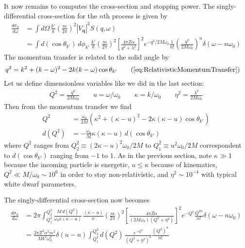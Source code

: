 \documentclass{article}
\begin{document}
It now remains to computes the cross-section and stopping power. The singly-differential cross-section for the $n$th process is given by
\begin{align}
\frac{d \sigma_n}{d \omega} &= \int d \Omega\, \frac{k'}{k} \left( \frac{m}{2 \pi} \right)^2 |V_\textbf{q}|^2 S(q, \omega)  \\
&= \int d(\cos\theta_{k'})\, d \phi_{k'}\, \frac{k'}{k} \left( \frac{m}{2 \pi} \right)^2 \left[ \frac{4 \pi Z\alpha}{q^2 + \lambda^2} \right]^2 e^{-q^2 / 2 M \omega_0} \frac{1}{n!}\left( \frac{q^2}{2 M \omega_0} \right)^n \delta(\omega - n \omega_0) \nonumber
\end{align}
The momentum transfer is related to the solid angle by
\begin{align}
q^2 &= k^2 + (k - \omega)^2 - 2 k(k - \omega)\cos\theta_{k'} \tag{\ref{eq:RelativisticMomentumTransfer}}
\end{align}
Let us define dimensionless variables like we did in the last section:
\begin{align}
Q^2 = \frac{q^2}{2 M \omega_0} \qquad u = \omega / \omega_0 \qquad \kappa = k / \omega_0 \qquad \eta^2 = \frac{\lambda^2}{2 M \omega_0}
\end{align}
Then from the momentum transfer we find
\begin{align}
Q^2 &= \frac{\omega_0}{2 M}\left( \kappa^2 + (\kappa - u)^2 - 2 \kappa(\kappa - u)\cos\theta_{k'} \right) \\
d(Q^2) &= -\frac{\omega_0}{M} \kappa(\kappa - u)\, d(\cos\theta_{k'})
\end{align}
where $Q^2$ ranges from $Q_2^2 \equiv (2 \kappa - u)^2 \omega_0 / 2 M$ to $Q_1^2 \equiv u^2 \omega_0 / 2 M$ correspondent to $d(\cos\theta_{k'})$ ranging from $-1$ to $1$. As in the previous section, note $\kappa \gg 1$ because the incoming particle is energetic, $u\leq \kappa$ because of kinematics, $Q^2 \ll M / \omega_0 \sim 10^6$ in order to stay non-relativistic, and $\eta^2 \sim 10^{-4}$ with typical white dwarf parameters.

The singly-differential cross-section now becomes
\begin{align}
\frac{d \sigma_n}{d \omega} &= 2 \pi\int_{Q_1^2}^{Q_2^2} \frac{M\,d(Q^2)}{\omega_0 \kappa(\kappa - u)}\, \frac{(\kappa - u)}{\kappa} \left( \frac{m}{2 \pi} \right)^2 \left[ \frac{4 \pi Z\alpha}{(2 M \omega_0)(Q^2 + \eta^2)} \right]^2 e^{-Q^2} \frac{Q^{2 n}}{n!} \delta(\omega - n \omega_0) \nonumber\\
   &= \frac{2 \pi Z^2 \alpha^2 m^2}{Mk^2 \omega_0^2} \delta(u - n) \int_{Q_1^2}^{Q_2^2} d(Q^2)\, \frac{e^{-Q^2}}{(Q^2 + \eta^2)^2} \frac{(Q^2)^n}{n!}
\end{align}
\end{document}
